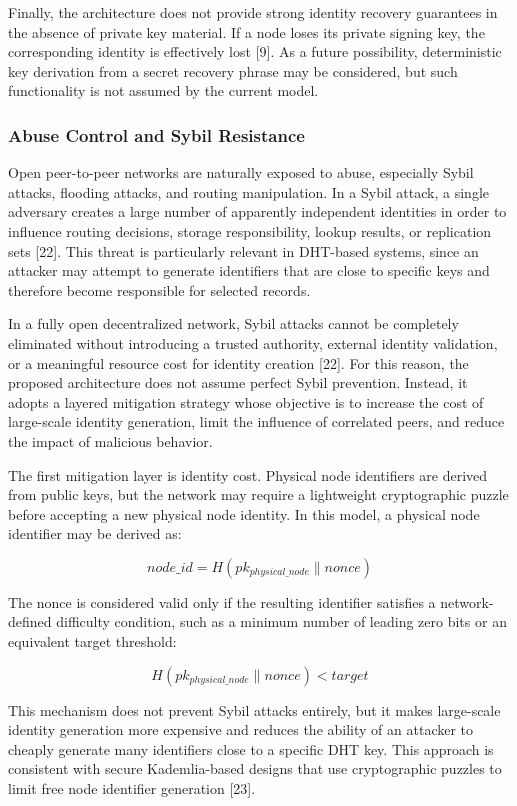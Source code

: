 \documentclass[12pt,a4paper]{article}
\begin{document}
Finally, the architecture does not provide strong identity recovery guarantees in the absence of private key material. If a node loses its private signing key, the corresponding identity is effectively lost [9]. As a future possibility, deterministic key derivation from a secret recovery phrase may be considered, but such functionality is not assumed by the current model.

\subsubsection{Abuse Control and Sybil Resistance}

Open peer-to-peer networks are naturally exposed to abuse, especially Sybil attacks,
flooding attacks, and routing manipulation. In a Sybil attack, a single adversary
creates a large number of apparently independent identities in order to influence
routing decisions, storage responsibility, lookup results, or replication sets
[22]. This threat is particularly relevant in DHT-based systems, since an attacker
may attempt to generate identifiers that are close to specific keys and therefore
become responsible for selected records.

In a fully open decentralized network, Sybil attacks cannot be completely eliminated
without introducing a trusted authority, external identity validation, or a meaningful
resource cost for identity creation [22]. For this reason, the proposed architecture
does not assume perfect Sybil prevention. Instead, it adopts a layered mitigation
strategy whose objective is to increase the cost of large-scale identity generation,
limit the influence of correlated peers, and reduce the impact of malicious behavior.

The first mitigation layer is identity cost. Physical node identifiers are derived
from public keys, but the network may require a lightweight cryptographic puzzle
before accepting a new physical node identity. In this model, a physical node
identifier may be derived as:

\[
node\_id = H(pk_{physical\_node} \parallel nonce)
\]

The nonce is considered valid only if the resulting identifier satisfies a
network-defined difficulty condition, such as a minimum number of leading zero bits
or an equivalent target threshold:

\[
H(pk_{physical\_node} \parallel nonce) < target
\]

This mechanism does not prevent Sybil attacks entirely, but it makes large-scale
identity generation more expensive and reduces the ability of an attacker to cheaply
generate many identifiers close to a specific DHT key. This approach is consistent
with secure Kademlia-based designs that use cryptographic puzzles to limit free
node identifier generation [23].
\end{document}
